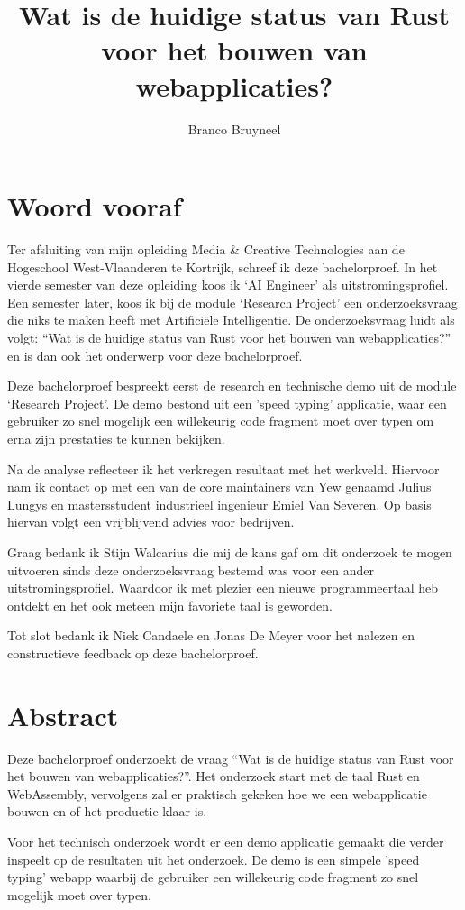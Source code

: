\documentclass[11pt,a4paper,oneside]{book}
\author{Branco Bruyneel}
\title{Wat is de huidige status van Rust voor het bouwen van webapplicaties?}
\begin{document}
\maketitle

\chapter*{Woord vooraf}
Ter afsluiting van mijn opleiding Media \& Creative Technologies aan de Hogeschool West-Vlaanderen
te Kortrijk, schreef ik deze bachelorproef.  In het vierde semester van deze opleiding koos ik ‘AI
Engineer’ als uitstromingsprofiel. Een semester later, koos ik bij de module ‘Research Project’ een
onderzoeksvraag die niks te maken heeft met Artificiële Intelligentie. De onderzoeksvraag luidt als
volgt: \enquote{Wat is de huidige status van Rust voor het bouwen van webapplicaties?} en is dan ook
het onderwerp voor deze bachelorproef. 

Deze bachelorproef bespreekt eerst de research en technische demo uit de module ‘Research Project’.
De demo bestond uit een 'speed typing' applicatie, waar een gebruiker zo snel mogelijk een
willekeurig code fragment moet over typen om erna zijn prestaties te kunnen bekijken. 

Na de analyse reflecteer ik het verkregen resultaat met het werkveld. Hiervoor nam ik contact op met
een van de core maintainers van Yew genaamd Julius Lungys en mastersstudent industrieel ingenieur
Emiel Van Severen. Op basis hiervan volgt een vrijblijvend advies voor bedrijven. 

Graag bedank ik Stijn Walcarius die mij de kans gaf om dit onderzoek te mogen uitvoeren sinds deze
onderzoeksvraag bestemd was voor een ander uitstromingsprofiel. Waardoor ik met plezier een nieuwe
programmeertaal heb ontdekt en het ook meteen mijn favoriete taal is geworden. 

Tot slot bedank ik Niek Candaele en Jonas De Meyer voor het nalezen en constructieve feedback op
deze bachelorproef.

\chapter*{Abstract}
Deze bachelorproef onderzoekt de vraag \enquote{Wat is de huidige status van Rust voor het bouwen
van webapplicaties?}. Het onderzoek start met de taal Rust en WebAssembly, vervolgens zal er
praktisch gekeken hoe we een webapplicatie bouwen en of het productie klaar is.

Voor het technisch onderzoek wordt er een demo applicatie gemaakt die verder inspeelt op de
resultaten uit het onderzoek. De demo is een simpele 'speed typing' webapp waarbij de gebruiker een
willekeurig code fragment zo snel mogelijk moet over typen.
\end{document}
